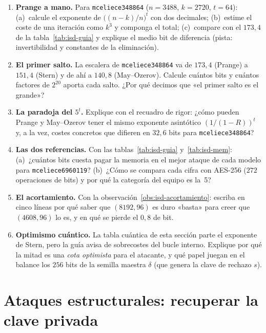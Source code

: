 \documentclass[11pt,a4paper,oneside]{report}
\begin{document}
\begin{enumerate}[leftmargin=1.6em,itemsep=4pt]
  \item \textbf{Prange a mano.} Para \texttt{mceliece348864}
        ($n=3488$, $k=2720$, $t=64$): (a)~calcule el exponente de
        $\bigl((n-k)/n\bigr)^{t}$ con dos decimales; (b)~estime el
        coste de una iteración como $k^{3}$ y componga el total;
        (c)~compare con el $173{,}4$ de la tabla~\ref{tab:isd-guia}
        y explique el medio bit de diferencia (pista: invertibilidad
        y constantes de la eliminación).
  \item \textbf{El primer salto.} La escalera de
        \texttt{mceliece348864} va de $173{,}4$ (Prange) a $151{,}4$
        (Stern) y de ahí a $140{,}8$ (May--Ozerov). Calcule cuántos
        bits y cuántos factores de $2^{20}$ aporta cada salto.
        ¿Por qué decimos que «el primer salto es el grande»?
  \item \textbf{La paradoja del $5^{t}$.} Explique con el recuadro
        de rigor: ¿cómo pueden Prange y May--Ozerov tener el mismo
        exponente asintótico $(1/(1-R))^{t}$ y, a la vez, costes
        concretos que difieren en $32{,}6$ bits para
        \texttt{mceliece348864}?
  \item \textbf{Las dos referencias.} Con las
        tablas~\ref{tab:isd-guia} y~\ref{tab:isd-mem}: (a)~¿cuántos
        bits cuesta pagar la memoria en el mejor ataque de cada
        modelo para \texttt{mceliece6960119}? (b)~¿Cómo se compara
        cada cifra con AES-256 ($272$ operaciones de bits) y por qué
        la categoría del equipo es la~5?
  \item \textbf{El acortamiento.} Con la
        observación~\ref{obs:isd-acortamiento}: escriba en cinco
        líneas por qué saber que $(8192,96)$ es duro «basta» para
        creer que $(4608,96)$ lo es, y en qué se pierde el $0{,}8$
        de bit.
  \item \textbf{Optimismo cuántico.} La tabla cuántica de esta
        sección parte el exponente de Stern, pero la guía avisa de
        sobrecostes del bucle interno. Explique por qué la mitad es
        una \emph{cota optimista} para el atacante, y qué papel
        juegan en el balance los $256$ bits de la semilla maestra
        $\delta$ (que genera la clave de rechazo $s$).
\end{enumerate}


\chapter{Ataques estructurales: recuperar la clave privada}\label{ch:estructura}
\end{document}
